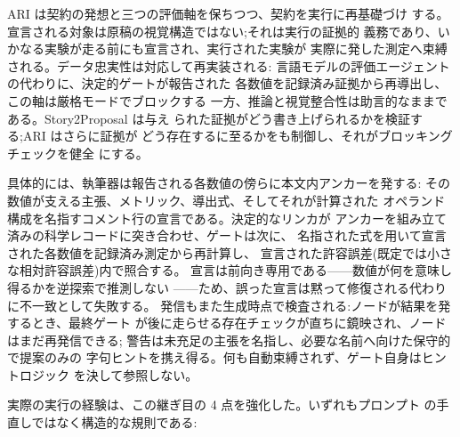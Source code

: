 ARI は契約の発想と三つの評価軸を保ちつつ、契約を実行に再基礎づけ
する。宣言される対象は原稿の視覚構造ではない;それは実行の証拠的
義務であり、いかなる実験が走る前にも宣言され、実行された実験が
実際に発した測定へ束縛される。データ忠実性は対応して再実装される:
言語モデルの評価エージェントの代わりに、決定的ゲートが報告された
各数値を記録済み証拠から再導出し、この軸は厳格モードでブロックする
一方、推論と視覚整合性は助言的なままである。Story2Proposal は与え
られた証拠がどう書き上げられるかを検証する;ARI はさらに証拠が
どう存在するに至るかをも制御し、それがブロッキングチェックを健全
にする。

具体的には、執筆器は報告される各数値の傍らに本文内アンカーを発する:
その数値が支える主張、メトリック、導出式、そしてそれが計算された
オペランド構成を名指すコメント行の宣言である。決定的なリンカが
アンカーを組み立て済みの科学レコードに突き合わせ、ゲートは次に、
名指された式を用いて宣言された各数値を記録済み測定から再計算し、
宣言された許容誤差(既定では小さな相対許容誤差)内で照合する。
宣言は前向き専用である——数値が何を意味し得るかを逆探索で推測しない
——ため、誤った宣言は黙って修復される代わりに不一致として失敗する。
発信もまた生成時点で検査される:ノードが結果を発するとき、最終ゲート
が後に走らせる存在チェックが直ちに鏡映され、ノードはまだ再発信できる;
警告は未充足の主張を名指し、必要な名前へ向けた保守的で提案のみの
字句ヒントを携え得る。何も自動束縛されず、ゲート自身はヒントロジック
を決して参照しない。

実際の実行の経験は、この継ぎ目の 4 点を強化した。いずれもプロンプト
の手直しではなく構造的な規則である:

